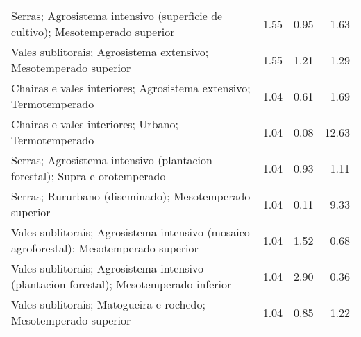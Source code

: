 \begin{table}[p]
\begin{tabular}{lrrr}
  Serras; Agrosistema intensivo (superficie de cultivo); Mesotemperado superior & 1.55 & 0.95 & 1.63 \\ 
  Vales sublitorais; Agrosistema extensivo; Mesotemperado superior & 1.55 & 1.21 & 1.29 \\ 
  Chairas e vales interiores; Agrosistema extensivo; Termotemperado & 1.04 & 0.61 & 1.69 \\ 
  Chairas e vales interiores; Urbano; Termotemperado & 1.04 & 0.08 & 12.63 \\ 
  Serras; Agrosistema intensivo (plantacion forestal); Supra e orotemperado & 1.04 & 0.93 & 1.11 \\ 
  Serras; Rururbano (diseminado); Mesotemperado superior & 1.04 & 0.11 & 9.33 \\ 
  Vales sublitorais; Agrosistema intensivo (mosaico agroforestal); Mesotemperado superior & 1.04 & 1.52 & 0.68 \\ 
  Vales sublitorais; Agrosistema intensivo (plantacion forestal); Mesotemperado inferior & 1.04 & 2.90 & 0.36 \\ 
  Vales sublitorais; Matogueira e rochedo; Mesotemperado superior & 1.04 & 0.85 & 1.22 \\ 
   \hline
\end{tabular}
\end{table}
